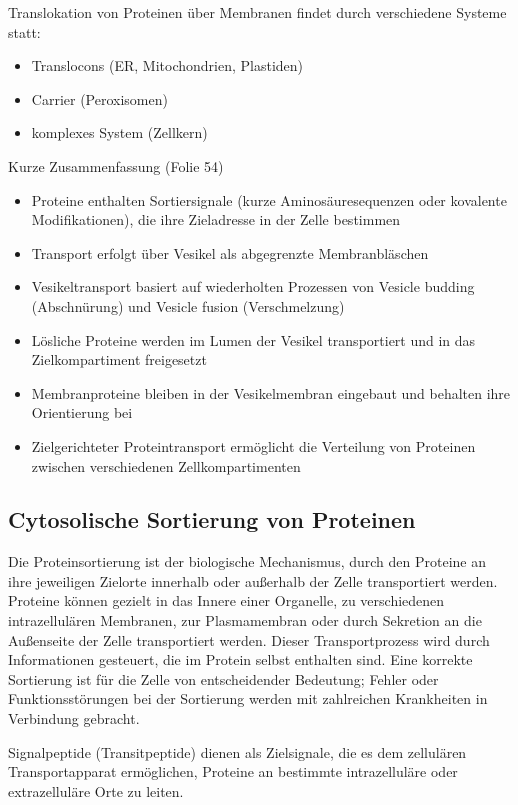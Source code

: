 Translokation von Proteinen über
Membranen findet durch verschiedene Systeme statt:
\begin{itemize}
    \item Translocons (ER, Mitochondrien,
    Plastiden)
    \item Carrier (Peroxisomen)
    \item komplexes System (Zellkern)
\end{itemize}

Kurze Zusammenfassung (Folie 54)
\begin{itemize}
    \item Proteine enthalten Sortiersignale (kurze Aminosäuresequenzen oder kovalente Modifikationen), die ihre Zieladresse in der Zelle bestimmen
    \item Transport erfolgt über Vesikel als abgegrenzte Membranbläschen
    \item Vesikeltransport basiert auf wiederholten Prozessen von Vesicle budding (Abschnürung) und Vesicle fusion (Verschmelzung)
    \item Lösliche Proteine werden im Lumen der Vesikel transportiert und in das Zielkompartiment freigesetzt
    \item Membranproteine bleiben in der Vesikelmembran eingebaut und behalten ihre Orientierung bei
    \item Zielgerichteter Proteintransport ermöglicht die Verteilung von Proteinen zwischen verschiedenen Zellkompartimenten
\end{itemize}

\subsection*{Cytosolische Sortierung von Proteinen}
Die Proteinsortierung ist der biologische Mechanismus, durch den Proteine an ihre jeweiligen Zielorte innerhalb oder außerhalb der Zelle transportiert werden.
Proteine können gezielt in das Innere einer Organelle, zu verschiedenen intrazellulären Membranen, zur Plasmamembran oder durch Sekretion an die Außenseite der Zelle transportiert werden.
Dieser Transportprozess wird durch Informationen gesteuert, die im Protein selbst enthalten sind.
Eine korrekte Sortierung ist für die Zelle von entscheidender Bedeutung; Fehler oder Funktionsstörungen bei der Sortierung werden mit zahlreichen Krankheiten in Verbindung gebracht.\cite{proteinSorting}

Signalpeptide (Transitpeptide) dienen als Zielsignale, die es dem zellulären Transportapparat ermöglichen, Proteine
an bestimmte intrazelluläre oder extrazelluläre Orte zu leiten.

